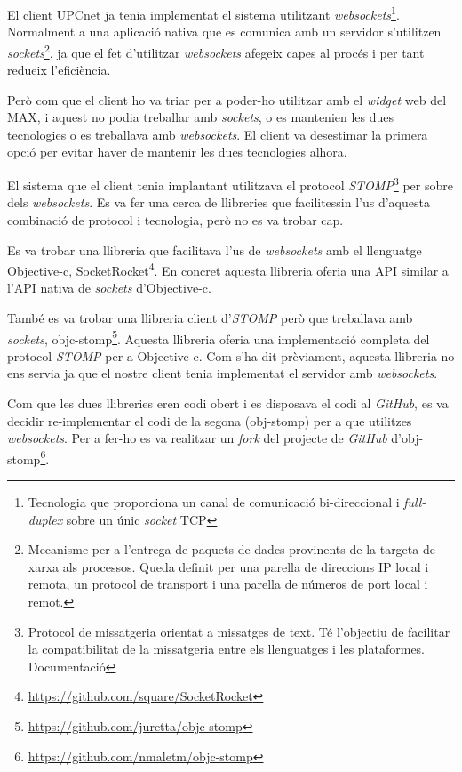 El client UPCnet ja tenia implementat el sistema utilitzant \textit{websockets}\footnote{Tecnologia que proporciona un canal de comunicació bi-direccional i \textit{full-duplex} sobre un únic \textit{socket} TCP}. Normalment a una aplicació nativa que es comunica amb un servidor s'utilitzen \textit{sockets}\footnote{Mecanisme per a l'entrega de paquets de dades provinents de la targeta de xarxa als processos. Queda definit per una parella de direccions IP local i remota, un protocol de transport i una parella de números de port local i remot.}, ja que el fet d'utilitzar \textit{websockets} afegeix capes al procés i per tant redueix l'eficiència.

Però com que el client ho va triar per a poder-ho utilitzar amb el \textit{widget} web del MAX, i aquest no podia treballar amb \textit{sockets}, o es mantenien les dues tecnologies o es treballava amb \textit{websockets}. El client va desestimar la primera opció per evitar haver de mantenir les dues tecnologies alhora.

El sistema que el client tenia implantant utilitzava el protocol \textit{STOMP}\footnote{Protocol de missatgeria orientat a missatges de text. Té l'objectiu de facilitar la compatibilitat de la missatgeria entre els llenguatges i les plataformes. Documentació\cite{stomp_doc}} per sobre dels \textit{websockets}. Es va fer una cerca de llibreries que facilitessin l'us d'aquesta combinació de protocol i tecnologia, però no es va trobar cap.

Es va trobar una llibreria que facilitava l'us de \textit{websockets} amb el llenguatge Objective-c, SocketRocket\footnote{\url{https://github.com/square/SocketRocket}}. En concret aquesta llibreria oferia una API similar a l'API nativa de \textit{sockets} d'Objective-c.

També es va trobar una llibreria client d'\textit{STOMP} però que treballava amb \textit{sockets}, objc-stomp\footnote{\url{https://github.com/juretta/objc-stomp}}. Aquesta llibreria oferia una implementació completa del protocol \textit{STOMP} per a Objective-c. Com s'ha dit prèviament, aquesta llibreria no ens servia ja que el nostre client tenia implementat el servidor amb \textit{websockets}.

Com que les dues llibreries eren codi obert i es disposava el codi al \textit{GitHub}, es va decidir re-implementar el codi de la segona (obj-stomp) per a que utilitzes \textit{websockets}. Per a fer-ho es va realitzar un \textit{fork} del projecte de \textit{GitHub} d'obj-stomp\footnote{\url{https://github.com/nmaletm/objc-stomp}}.

